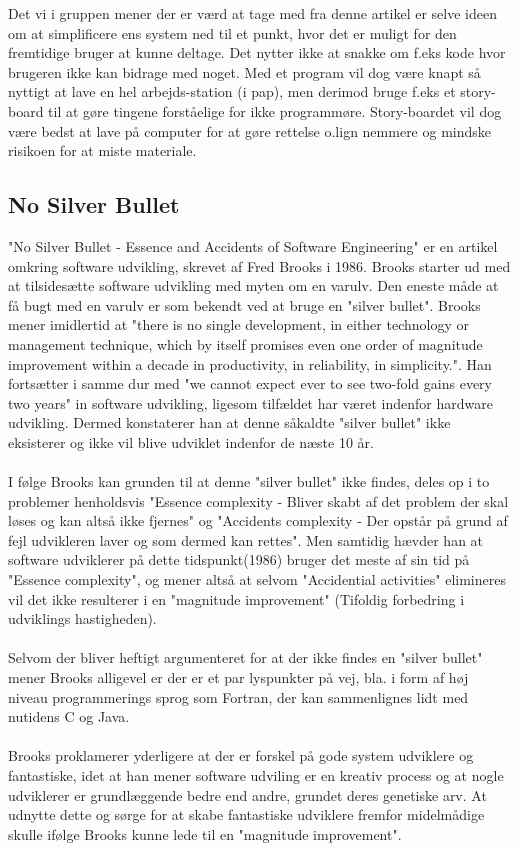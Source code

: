 \documentclass[12pt]{article}
\begin{document}
Det vi i gruppen mener der er værd at tage med fra denne artikel er selve ideen om at simplificere ens system ned til et punkt, hvor det er muligt for den fremtidige bruger at kunne deltage. Det nytter ikke at snakke om f.eks kode hvor brugeren ikke kan bidrage med noget. Med et program vil dog være knapt så nyttigt at lave en hel arbejds-station (i pap), men derimod bruge f.eks et story-board til at gøre tingene forståelige for ikke programmøre. Story-boardet vil dog være bedst at lave på computer for at gøre rettelse o.lign nemmere og mindske risikoen for at miste materiale.

\pagebreak
\subsection*{No Silver Bullet}

"No Silver Bullet - Essence and Accidents of Software Engineering" er en artikel omkring software udvikling, skrevet af Fred Brooks i 1986. Brooks starter ud med at tilsidesætte software udvikling med myten om en varulv. Den eneste måde at få bugt med en varulv er som bekendt ved at bruge en "silver bullet". Brooks mener imidlertid  at  "there is no single development, in either technology or management technique, which by itself promises even one order of magnitude improvement within a decade in productivity, in reliability, in simplicity.". Han fortsætter i samme dur med "we cannot expect ever to see two-fold gains every two years" in software udvikling, ligesom tilfældet har været indenfor hardware udvikling. Dermed konstaterer han at denne såkaldte "silver bullet" ikke eksisterer og ikke vil blive udviklet indenfor de næste 10 år.\\\\
I følge Brooks kan grunden til at denne "silver bullet"  ikke findes, deles op i to problemer henholdsvis "Essence complexity - Bliver skabt af det problem der skal løses og kan altså ikke fjernes" og "Accidents complexity - Der opstår på grund af fejl udvikleren laver og som dermed kan rettes". Men samtidig hævder han at software udviklerer på dette tidspunkt(1986) bruger det meste af sin tid på "Essence complexity", og mener altså at selvom "Accidential activities" elimineres vil det ikke resulterer i en "magnitude improvement" (Tifoldig forbedring i udviklings hastigheden).  \\\\
Selvom der bliver heftigt argumenteret for at der ikke findes en "silver bullet" mener Brooks alligevel er der er et par lyspunkter på vej, bla. i form af høj niveau programmerings sprog som Fortran, der kan sammenlignes lidt med nutidens C og Java. \\\\
Brooks proklamerer yderligere at der er forskel på gode system udviklere og fantastiske, idet at han mener software udviling er en kreativ process og at nogle udviklerer er grundlæggende bedre end andre, grundet deres genetiske arv. At udnytte dette og sørge for at skabe fantastiske udviklere fremfor midelmådige skulle ifølge Brooks kunne lede til en "magnitude improvement".\\\\
\newpage
\end{document}
